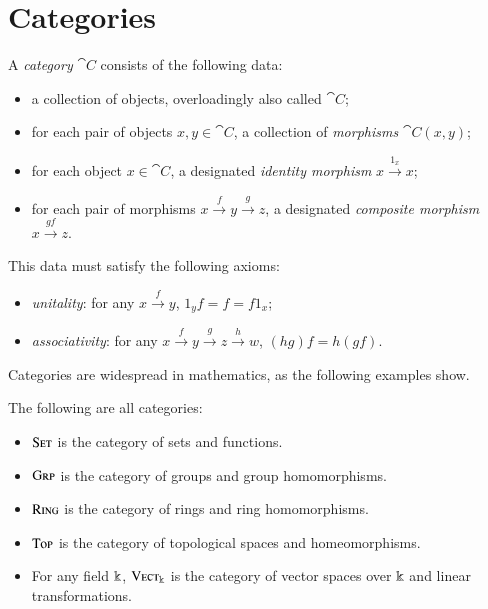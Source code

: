 
\section{Categories}

\begin{dfn}[Category]\label{def:category}
A \emph{category} $\cat{C}$ consists of the following data:
\begin{itemize}
  \item a collection\footnotemark{} of objects, overloadingly also called $\cat{C}$;
	\item for each pair of objects $x,y \in  \cat{C}$, a collection of \emph{morphisms} $\cat{C}(x, y)$;
	\item for each object $x \in \cat{C}$, a designated \emph{identity morphism} $x \xrightarrow{1_x}  x$;
  \item for each pair of morphisms $x \xrightarrow{f}  y \xrightarrow{g}  z$, a designated \emph{composite morphism} $x \xrightarrow{gf}  z$.
\end{itemize}
This data must satisfy the following axioms:
\begin{itemize}
  \item \emph{unitality}: for any $x \xrightarrow{f}  y$, $1_yf = f = f1_x$;
  \item \emph{associativity}: for any $x \xrightarrow{f} 		y \xrightarrow{g} z \xrightarrow{h} w$, $(hg)f = h(gf)$.
\end{itemize}
\end{dfn}


\noindent
Categories are widespread in mathematics, as the following examples show.

\begin{ex}\label{ex:concrete categories}The following are all categories:
  \begin{itemize}
    \item ${\textsc{\text{Set}}}$ is the category of sets and functions.
    \item ${\textsc{\text{Grp}}}$ is the category of groups and group homomorphisms.
    \item ${\textsc{\text{Ring}}}$ is the category of rings and ring homomorphisms.
    \item ${\textsc{\text{Top}}}$ is the category of topological spaces and homeomorphisms.
    \item For any field $\Bbbk$, ${\textsc{\text{Vect}}}_\Bbbk$ is the category of vector
      spaces over $\Bbbk$ and linear transformations.
  \end{itemize}
\end{ex}


